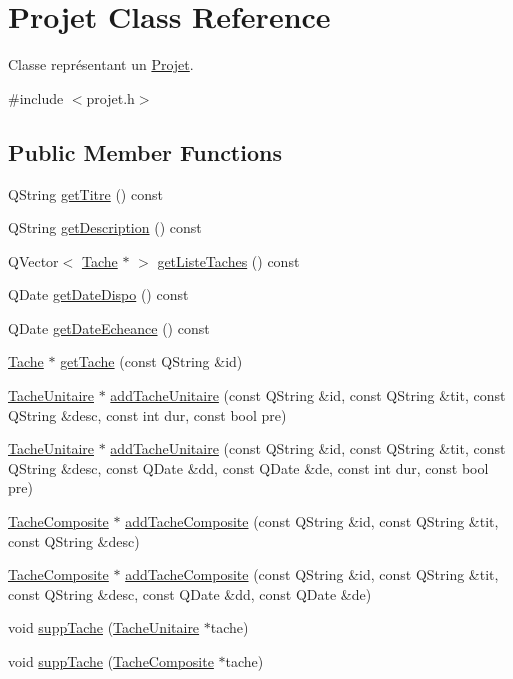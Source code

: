 \hypertarget{class_projet}{}\section{Projet Class Reference}
\label{class_projet}


Classe représentant un \hyperlink{class_projet}{Projet}.  




{\ttfamily \#include $<$projet.\+h$>$}

\subsection*{Public Member Functions}
\begin{DoxyCompactItemize}
\item 
Q\+String \hyperlink{class_projet_aafdae1361272085ee8683738d70d0612}{get\+Titre} () const 
\item 
Q\+String \hyperlink{class_projet_a4b939075b8f652846f8fc6457343219e}{get\+Description} () const 
\item 
Q\+Vector$<$ \hyperlink{class_tache}{Tache} $\ast$ $>$ \hyperlink{class_projet_abc5c0c5980be9a1639651dc23789f068}{get\+Liste\+Taches} () const 
\item 
Q\+Date \hyperlink{class_projet_a226d910000aaecf7e44399f2226496f5}{get\+Date\+Dispo} () const 
\item 
Q\+Date \hyperlink{class_projet_a6a54a69a00cbaebd362e02f8e7dc3803}{get\+Date\+Echeance} () const 
\item 
\hyperlink{class_tache}{Tache} $\ast$ \hyperlink{class_projet_a4bd470370df8fd883386069a90b958e2}{get\+Tache} (const Q\+String \&id)
\item 
\hyperlink{class_tache_unitaire}{Tache\+Unitaire} $\ast$ \hyperlink{class_projet_a3dfe2bda911378a958b57a6684624804}{add\+Tache\+Unitaire} (const Q\+String \&id, const Q\+String \&tit, const Q\+String \&desc, const int dur, const bool pre)
\item 
\hyperlink{class_tache_unitaire}{Tache\+Unitaire} $\ast$ \hyperlink{class_projet_a8434e7255cace66ff199cb0ba6636535}{add\+Tache\+Unitaire} (const Q\+String \&id, const Q\+String \&tit, const Q\+String \&desc, const Q\+Date \&dd, const Q\+Date \&de, const int dur, const bool pre)
\item 
\hyperlink{class_tache_composite}{Tache\+Composite} $\ast$ \hyperlink{class_projet_aa5f49aee0f30445f1e612311848b78ba}{add\+Tache\+Composite} (const Q\+String \&id, const Q\+String \&tit, const Q\+String \&desc)
\item 
\hyperlink{class_tache_composite}{Tache\+Composite} $\ast$ \hyperlink{class_projet_aee6a754a368eb0ea47b2fa7317ea5055}{add\+Tache\+Composite} (const Q\+String \&id, const Q\+String \&tit, const Q\+String \&desc, const Q\+Date \&dd, const Q\+Date \&de)
\item 
void \hyperlink{class_projet_a649b8123c195bc575871576c9f350d14}{supp\+Tache} (\hyperlink{class_tache_unitaire}{Tache\+Unitaire} $\ast$tache)
\item 
void \hyperlink{class_projet_a1af5c7716e8893066418afc5e8c09f3c}{supp\+Tache} (\hyperlink{class_tache_composite}{Tache\+Composite} $\ast$tache)
\end{DoxyCompactItemize}
